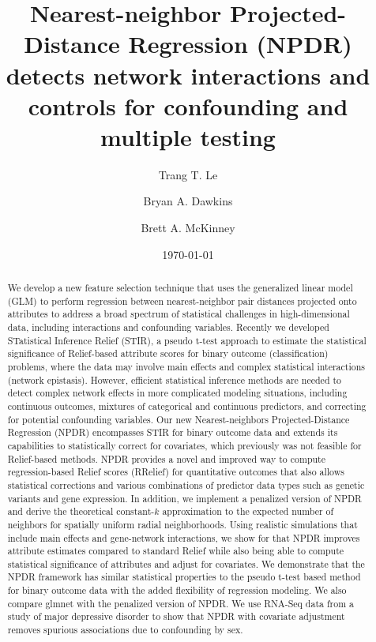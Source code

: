 \documentclass[10pt]{article}
\title{Nearest-neighbor Projected-Distance Regression (NPDR) detects network interactions and controls for confounding and multiple testing}
\author[1]{Trang T. Le}
\author[2]{Bryan A. Dawkins}
\author[2,3*]{Brett A. McKinney}
\affil[1]{Department of Biostatistics, Epidemiology and Informatics,
University of Pennsylvania, Philadelphia, PA 19104}
\affil[2]{Department of Mathematics, University of Tulsa, Tulsa, OK 74104}
\affil[3]{Tandy School of Computer Science, University of Tulsa, Tulsa, OK 74104}
\date{\today}
\begin{document}

\maketitle
\begin{abstract}
        
We develop a new feature selection technique that uses the generalized linear model (GLM) to perform regression between nearest-neighbor pair distances projected onto attributes to address a broad spectrum of statistical challenges in high-dimensional data, including interactions and confounding variables.
Recently we developed STatistical Inference Relief (STIR), a pseudo t-test approach to estimate the statistical significance of Relief-based attribute scores for binary outcome (classification) problems, where the data may involve main effects and complex statistical interactions (network epistasis).
However, efficient statistical inference methods are needed to detect complex network effects in more complicated modeling situations, including continuous outcomes, mixtures of categorical and continuous predictors, and correcting for potential confounding variables.
Our new Nearest-neighbors Projected-Distance Regression (NPDR) encompasses STIR for binary outcome data and extends its capabilities to statistically correct for covariates, which previously was not feasible for Relief-based methods.
NPDR provides a novel and improved way to compute regression-based Relief scores (RRelief) for quantitative outcomes that also allows statistical corrections and various combinations of predictor data types such as genetic variants and gene expression.
In addition, we implement a penalized version of NPDR and derive the theoretical constant-$k$ approximation to the expected number of neighbors for spatially uniform radial neighborhoods. 
Using realistic simulations that include main effects and gene-network interactions, we show for that NPDR improves attribute estimates compared to standard Relief while also being able to compute statistical significance of attributes and adjust for covariates.
We demonstrate that the NPDR framework has similar statistical properties to the pseudo t-test based method for binary outcome data with the added flexibility of regression modeling. We also compare glmnet with the penalized version of NPDR.
We use RNA-Seq data from a study of major depressive disorder to show that NPDR with covariate adjustment removes spurious associations due to confounding by sex. 
\\

\end{abstract}
\end{document}
